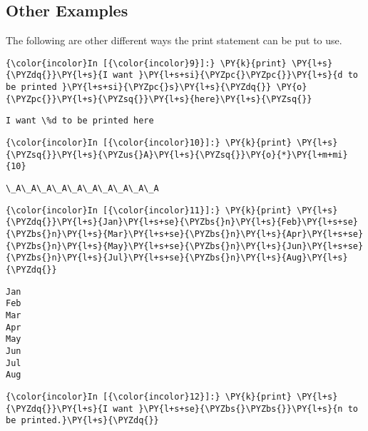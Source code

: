     \subsection{Other Examples}\label{other-examples}

    The following are other different ways the print statement can be put to
use.

    \begin{Verbatim}[commandchars=\\\{\}]
{\color{incolor}In [{\color{incolor}9}]:} \PY{k}{print} \PY{l+s}{\PYZdq{}}\PY{l+s}{I want }\PY{l+s+si}{\PYZpc{}\PYZpc{}}\PY{l+s}{d to be printed }\PY{l+s+si}{\PYZpc{}s}\PY{l+s}{\PYZdq{}} \PY{o}{\PYZpc{}}\PY{l+s}{\PYZsq{}}\PY{l+s}{here}\PY{l+s}{\PYZsq{}}
\end{Verbatim}

    \begin{Verbatim}[commandchars=\\\{\}]
I want \%d to be printed here
    \end{Verbatim}

    \begin{Verbatim}[commandchars=\\\{\}]
{\color{incolor}In [{\color{incolor}10}]:} \PY{k}{print} \PY{l+s}{\PYZsq{}}\PY{l+s}{\PYZus{}A}\PY{l+s}{\PYZsq{}}\PY{o}{*}\PY{l+m+mi}{10}
\end{Verbatim}

    \begin{Verbatim}[commandchars=\\\{\}]
\_A\_A\_A\_A\_A\_A\_A\_A\_A\_A
    \end{Verbatim}

    \begin{Verbatim}[commandchars=\\\{\}]
{\color{incolor}In [{\color{incolor}11}]:} \PY{k}{print} \PY{l+s}{\PYZdq{}}\PY{l+s}{Jan}\PY{l+s+se}{\PYZbs{}n}\PY{l+s}{Feb}\PY{l+s+se}{\PYZbs{}n}\PY{l+s}{Mar}\PY{l+s+se}{\PYZbs{}n}\PY{l+s}{Apr}\PY{l+s+se}{\PYZbs{}n}\PY{l+s}{May}\PY{l+s+se}{\PYZbs{}n}\PY{l+s}{Jun}\PY{l+s+se}{\PYZbs{}n}\PY{l+s}{Jul}\PY{l+s+se}{\PYZbs{}n}\PY{l+s}{Aug}\PY{l+s}{\PYZdq{}}
\end{Verbatim}

    \begin{Verbatim}[commandchars=\\\{\}]
Jan
Feb
Mar
Apr
May
Jun
Jul
Aug
    \end{Verbatim}

    \begin{Verbatim}[commandchars=\\\{\}]
{\color{incolor}In [{\color{incolor}12}]:} \PY{k}{print} \PY{l+s}{\PYZdq{}}\PY{l+s}{I want }\PY{l+s+se}{\PYZbs{}\PYZbs{}}\PY{l+s}{n to be printed.}\PY{l+s}{\PYZdq{}}
\end{Verbatim}

